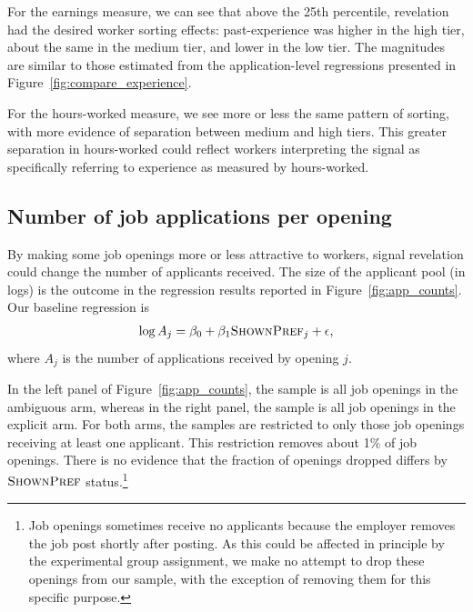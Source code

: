 \documentclass[12pt]{article}
\begin{document}
For the earnings measure, we can see that above the 25th percentile, revelation had the desired worker sorting effects:
past-experience was higher in the high tier, about the same in the medium tier, and lower in the low tier.
The magnitudes are similar to those estimated from the application-level regressions presented in Figure~\ref{fig:compare_experience}.

For the hours-worked measure, we see more or less the same pattern of sorting, with more evidence of separation between medium and high tiers.
This greater separation in hours-worked could reflect workers interpreting the signal as specifically referring to experience as measured by hours-worked. 

\subsection{Number of job applications per opening}
By making some job openings more or less attractive to workers, signal revelation could change the number of applicants received.
The size of the applicant pool (in logs) is the outcome in the regression results reported in Figure~\ref{fig:app_counts}. 
Our baseline regression is 
\begin{align} \label{eq:apps}
\log A_j = \beta_0 + \beta_1 \textsc{ShownPref}_j + \epsilon, 
\end{align} 
where $A_j$ is the number of applications received by opening $j$. 

In the left panel of Figure~\ref{fig:app_counts}, the sample is all job openings in the ambiguous arm, whereas in the right panel, the sample is all job openings in the explicit arm.
For both arms, the samples are restricted to only those job openings receiving at least one applicant.
This restriction removes about 1\% of job openings.
There is no evidence that the fraction of openings dropped differs by $\textsc{ShownPref}$ status.\footnote{
      Job openings sometimes receive no applicants because the employer removes the job post shortly after posting. As this could be affected in principle by the experimental group assignment, we make no attempt to drop these openings from our sample, with the exception of removing them for this specific purpose. 
}
\end{document}
